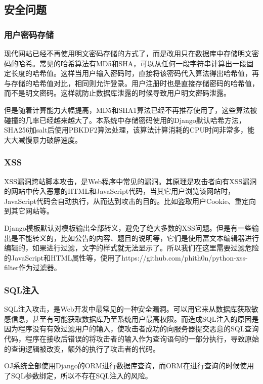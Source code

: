 \subsection{安全问题}

\subsubsection{用户密码存储}

现代网站已经不再使用明文密码存储的方式了，而是改用只在数据库中存储明文密码的哈希。常见的哈希算法有MD5和SHA，可以从任何一段字符串计算出一段固定长度的哈希值。这样当用户输入密码时，直接将该密码代入算法得出哈希值，再与存储的哈希值对比，相同则允许登录。用户注册时也是直接存储密码的哈希值，而不是明文密码。这样就防止数据库泄露的时候导致用户明文密码泄露。

但是随着计算能力大幅提高，MD5和SHA1算法已经不再推荐使用了，这些算法被碰撞的几率已经越来越大了。本系统中存储密码使用的Django默认哈希方法，SHA256加salt后使用PBKDF2算法处理，该算法计算消耗的CPU时间非常多，能大大减慢暴力破解速度。

\subsubsection{XSS}

XSS漏洞跨站脚本攻击，是Web程序中常见的漏洞。其原理是攻击者向有XSS漏洞的网站中传入恶意的HTML和JavaScript代码，当其它用户浏览该网站时，JavaScript代码会自动执行，从而达到攻击的目的。比如盗取用户Cookie、重定向到其它网站等。

Django模板默认对模板输出全部转义，避免了绝大多数的XSS问题。但是有一些输出是不能转义的，比如公告的内容、题目的说明等，它们是使用富文本编辑器进行编辑的，如果进行过滤，文字的样式就无法显示了。所以我们在这里需要过滤危险的JavaScript和HTML属性等，使用了https://github.com/phith0n/python-xss-filter作为过滤器。

\subsubsection{SQL注入}

SQL注入攻击，是Web开发中最常见的一种安全漏洞。可以用它来从数据库获取敏感信息，甚至有可能获取数据库乃至系统用户最高权限。而造成SQL注入的原因是因为程序没有有效过滤用户的输入，使攻击者成功的向服务器提交恶意的SQL查询代码，程序在接收后错误的将攻击者的输入作为查询语句的一部分执行，导致原始的查询逻辑被改变，额外的执行了攻击者的代码。

OJ系统全部使用Django的ORM进行数据库查询，而ORM在进行查询的时候使用了SQL参数绑定，所以不存在SQL注入的风险。

